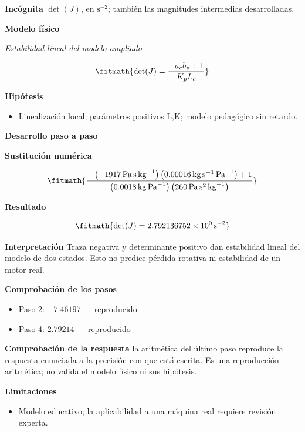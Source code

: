 \documentclass[10pt,openany]{book}
\begin{document}
\noindent\textbf{Incógnita}
$\det(J)$, en $\mathrm{s^{-2}}$; también las magnitudes intermedias desarrolladas.

\noindent\textbf{Modelo físico}

\noindent\textit{Estabilidad lineal del modelo ampliado}

\[
\fitmath{\det(J)=\frac{- a_c b_v + 1}{K_p L_c}}
\]

\noindent\textbf{Hipótesis}
\begin{itemize}
\item Linealización local; parámetros positivos L,K; modelo pedagógico sin retardo.
\end{itemize}

\noindent\textbf{Desarrollo paso a paso}



\noindent\textbf{Sustitución numérica}

\[
\fitmath{\frac{- \left(-1917\,\mathrm{Pa}\,\mathrm{s}\,\mathrm{kg}^{-1}\right) \left(0.00016\,\mathrm{kg}\,\mathrm{s}^{-1}\,\mathrm{Pa}^{-1}\right) + 1}{\left(0.0018\,\mathrm{kg}\,\mathrm{Pa}^{-1}\right) \left(260\,\mathrm{Pa}\,\mathrm{s}^{2}\,\mathrm{kg}^{-1}\right)}}
\]

\noindent\textbf{Resultado}

\[
\fitmath{\det(J)=2.792136752\times10^{0}\,\mathrm{s}^{-2}}
\]

\noindent\textbf{Interpretación}
Traza negativa y determinante positivo dan estabilidad lineal del modelo de dos estados. Esto no predice pérdida rotativa ni estabilidad de un motor real.

\noindent\textbf{Comprobación de los pasos}
\begin{itemize}
\item Paso 2: $-7.46197$ — reproducido
\item Paso 4: $2.79214$ — reproducido
\end{itemize}

\noindent\textbf{Comprobación de la respuesta} la aritmética del último paso reproduce la respuesta enunciada a la precisión con que está escrita. Es una reproducción aritmética; no valida el modelo físico ni sus hipótesis.

\noindent\textbf{Limitaciones}
\begin{itemize}
\item Modelo educativo; la aplicabilidad a una máquina real requiere revisión experta.
\end{itemize}
\end{document}
